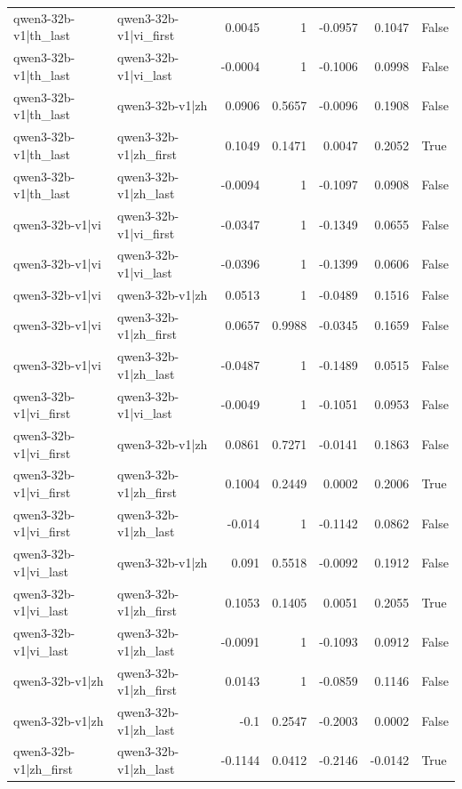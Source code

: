 \begin{table}
\begin{tabular}{l l r r r r l}
qwen3-32b-v1|th_last & qwen3-32b-v1|vi_first & 0.0045 & 1 & -0.0957 & 0.1047 & False \\
qwen3-32b-v1|th_last & qwen3-32b-v1|vi_last & -0.0004 & 1 & -0.1006 & 0.0998 & False \\
qwen3-32b-v1|th_last & qwen3-32b-v1|zh & 0.0906 & 0.5657 & -0.0096 & 0.1908 & False \\
qwen3-32b-v1|th_last & qwen3-32b-v1|zh_first & 0.1049 & 0.1471 & 0.0047 & 0.2052 & True \\
qwen3-32b-v1|th_last & qwen3-32b-v1|zh_last & -0.0094 & 1 & -0.1097 & 0.0908 & False \\
qwen3-32b-v1|vi & qwen3-32b-v1|vi_first & -0.0347 & 1 & -0.1349 & 0.0655 & False \\
qwen3-32b-v1|vi & qwen3-32b-v1|vi_last & -0.0396 & 1 & -0.1399 & 0.0606 & False \\
qwen3-32b-v1|vi & qwen3-32b-v1|zh & 0.0513 & 1 & -0.0489 & 0.1516 & False \\
qwen3-32b-v1|vi & qwen3-32b-v1|zh_first & 0.0657 & 0.9988 & -0.0345 & 0.1659 & False \\
qwen3-32b-v1|vi & qwen3-32b-v1|zh_last & -0.0487 & 1 & -0.1489 & 0.0515 & False \\
qwen3-32b-v1|vi_first & qwen3-32b-v1|vi_last & -0.0049 & 1 & -0.1051 & 0.0953 & False \\
qwen3-32b-v1|vi_first & qwen3-32b-v1|zh & 0.0861 & 0.7271 & -0.0141 & 0.1863 & False \\
qwen3-32b-v1|vi_first & qwen3-32b-v1|zh_first & 0.1004 & 0.2449 & 0.0002 & 0.2006 & True \\
qwen3-32b-v1|vi_first & qwen3-32b-v1|zh_last & -0.014 & 1 & -0.1142 & 0.0862 & False \\
qwen3-32b-v1|vi_last & qwen3-32b-v1|zh & 0.091 & 0.5518 & -0.0092 & 0.1912 & False \\
qwen3-32b-v1|vi_last & qwen3-32b-v1|zh_first & 0.1053 & 0.1405 & 0.0051 & 0.2055 & True \\
qwen3-32b-v1|vi_last & qwen3-32b-v1|zh_last & -0.0091 & 1 & -0.1093 & 0.0912 & False \\
qwen3-32b-v1|zh & qwen3-32b-v1|zh_first & 0.0143 & 1 & -0.0859 & 0.1146 & False \\
qwen3-32b-v1|zh & qwen3-32b-v1|zh_last & -0.1 & 0.2547 & -0.2003 & 0.0002 & False \\
qwen3-32b-v1|zh_first & qwen3-32b-v1|zh_last & -0.1144 & 0.0412 & -0.2146 & -0.0142 & True \\
\bottomrule
\end{tabular}
\end{table}
